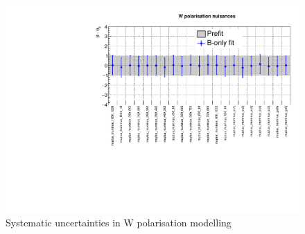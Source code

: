 \clearpage
\begin{figure}[h!]
  \centering
  \caption{Systematic uncertainties in W polarisation modelling}
  \includegraphics[width=0.8\linewidth]{figures/results/36invfb_preapproval/postfit/nuis/WPol_nuisances}
\end{figure}
